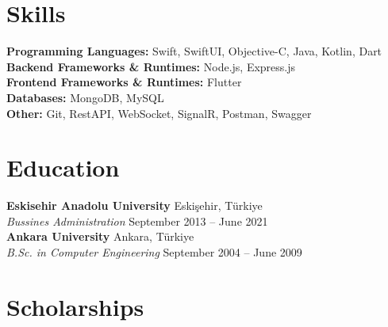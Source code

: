 \documentclass[10pt,a4paper]{extarticle}
\begin{document}
\section{Skills}
\textbf{Programming Languages:} Swift, SwiftUI, Objective-C, Java, Kotlin, Dart\\
\textbf{Backend Frameworks \& Runtimes:} Node.js, Express.js\\
\textbf{Frontend Frameworks \& Runtimes:} Flutter\\
\textbf{Databases:} MongoDB, MySQL\\
\textbf{Other:} Git, RestAPI, WebSocket, SignalR, Postman, Swagger
\section{Education}
\textbf{Eskisehir Anadolu University} \hfill Eskişehir, Türkiye\\
\textit{Bussines Administration} \hfill September 2013 -- June 2021\\
\textbf{Ankara University} \hfill Ankara, Türkiye\\
\textit{B.Sc. in Computer Engineering} \hfill September 2004 -- June 2009\\
\section{Scholarships}
\end{document}
